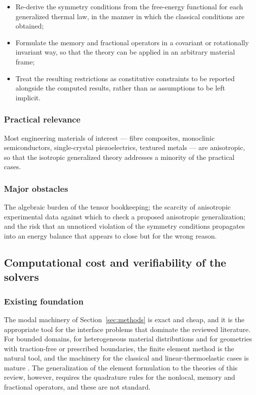 \begin{itemize}
\item Re-derive the symmetry conditions from the free-energy functional for each generalized thermal law, in the manner in which the classical conditions are obtained;
\item Formulate the memory and fractional operators in a covariant or rotationally invariant way, so that the theory can be applied in an arbitrary material frame;
\item Treat the resulting restrictions as constitutive constraints to be reported alongside the computed results, rather than as assumptions to be left implicit.
\end{itemize}

\subsubsection{Practical relevance}

Most engineering materials of interest --- fibre composites, monoclinic semiconductors, single-crystal piezoelectrics, textured metals --- are anisotropic, so that the isotropic generalized theory addresses a minority of the practical cases.

\subsubsection{Major obstacles}

The algebraic burden of the tensor bookkeeping; the scarcity of anisotropic experimental data against which to check a proposed anisotropic generalization; and the risk that an unnoticed violation of the symmetry conditions propagates into an energy balance that appears to close but for the wrong reason.

\subsection{Computational cost and verifiability of the solvers}
\label{sec:15.10}

\subsubsection{Existing foundation}

The modal machinery of Section~\ref{sec:methods} is exact and cheap, and it is the appropriate tool for the interface problems that dominate the reviewed literature. For bounded domains, for heterogeneous material distributions and for geometries with traction-free or prescribed boundaries, the finite element method is the natural tool, and the machinery for the classical and linear-thermoelastic cases is mature \cite{Hughes1980}. The generalization of the element formulation to the theories of this review, however, requires the quadrature rules for the nonlocal, memory and fractional operators, and these are not standard.

